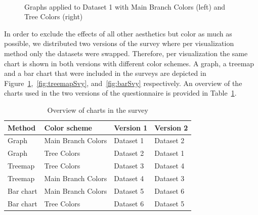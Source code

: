 \documentclass[journal]{vgtc}                %
\begin{document}
\begin{figure}[tb]
  \centering
  \mbox{
  }
  \caption{Graphs applied to Dataset 1 with Main Branch Colors (left) and Tree Colors (right)}\label{fig:graphSvy}

\end{figure}

In order to exclude the effects of all other aesthetics but color as much as possible, we distributed two versions of the survey where per visualization method only the datasets were swapped. Therefore, per visualization the same chart is shown in both versions with different color schemes. A graph, a treemap and a bar chart that were included in the surveys are depicted in Figure~\ref{fig:graphSvy},~\ref{fig:treemapSvy}, and~\ref{fig:barSvy} respectively. An overview of the charts used in the two versions of the questionnaire is provided in Table~\ref{table:ques}.

\begin{table}[tb]
\begin{footnotesize}
\begin{tabular}{llll}
\toprule
Method & Color scheme & Version 1 & Version 2\\
\midrule
Graph & Main Branch Colors & Dataset 1 & Dataset 2\\
Graph & Tree Colors & Dataset 2 & Dataset 1\\
Treemap & Tree Colors & Dataset 3 & Dataset 4\\
Treemap & Main Branch Colors & Dataset 4 & Dataset 3\\
Bar chart & Main Branch Colors & Dataset 5 & Dataset 6\\
Bar chart & Tree Colors & Dataset 6 & Dataset 5\\
\bottomrule
\end{tabular}
\end{footnotesize}
\caption{Overview of charts in the survey}\label{table:ques}
\end{table}
\end{document}
